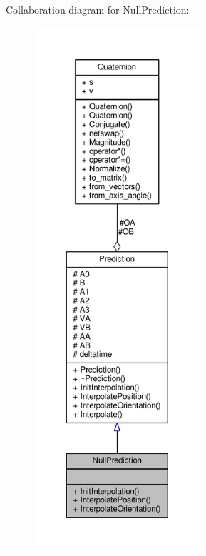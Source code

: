 Collaboration diagram for Null\+Prediction\+:
\nopagebreak
\begin{figure}[H]
\begin{center}
\leavevmode
\includegraphics[height=550pt]{d3/de7/classNullPrediction__coll__graph}
\end{center}
\end{figure}
